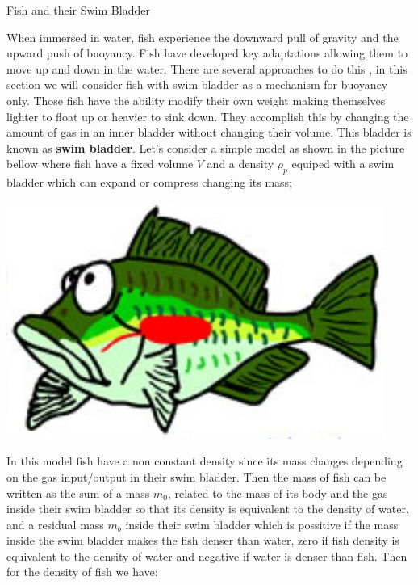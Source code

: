 \begin{section}{Fish and their Swim Bladder}

    When immersed in water, fish experience the downward pull of gravity and the upward push of 
    buoyancy. Fish have developed key adaptations allowing them to move up and down in the water.
    There are several approaches to do this \cite{QUENTIN}, in this section we will consider fish
    with swim bladder as a mechanism for buoyancy only. Those fish have the ability modify their 
    own weight making themselves lighter to float up or heavier to sink down. They accomplish this
    by changing the amount of gas in an inner bladder without changing their volume. This bladder
    is known as \textbf{swim bladder}. Let's consider a simple model as shown in the picture 
    bellow where fish have a fixed volume $V$ and a density $\rho_p$ equiped with a swim bladder
    which can expand or compress changing its mass;
    
    \begin{center}
        \includegraphics[scale=0.35]{./pics/fish_bladder.jpg}
    \end{center}
    
    In this model fish have a non constant density since its mass changes depending on the gas
    input/output in their swim bladder. Then the mass of fish can be written as the sum of a 
    mass $m_0$, related to the mass of its body and the gas inside their swim bladder so that 
    its density is equivalent to the density of water, and a residual mass $m_b$ inside their 
    swim bladder which is possitive if the mass inside the swim bladder makes the fish denser 
    than water, zero if fish density is equivalent to the density of water and negative if 
    water is denser than fish. Then for the density of fish we have: 
    

\end{section}
